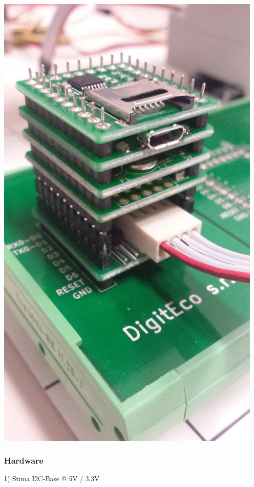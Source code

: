 \begin{DoxyImageNoCaption}
  \mbox{\includegraphics[width=\textwidth,height=\textheight/2,keepaspectratio=true]{passive.jpg}}
\end{DoxyImageNoCaption}
\hypertarget{index_stima_passive_hardware}{}\subsubsection{Hardware}\label{index_stima_passive_hardware}
1) Stima I2\+C-\/\+Base @ 5V / 3.\+3V

